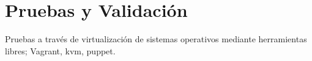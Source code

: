 

\section{Pruebas y Validación}
\label{sec:pruebas-validacion}

\par Pruebas a trav\'es de virtualizaci\'on de sistemas operativos mediante herramientas libres; Vagrant, kvm, puppet.

